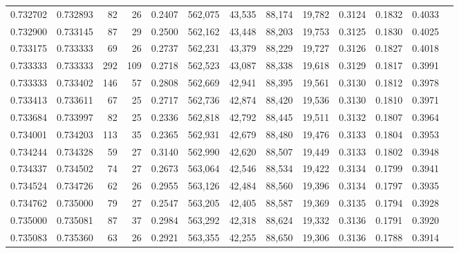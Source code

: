\begin{tabular}{rrrrrrrrrrrrr}
0.732702 & 0.732893 &     82 &    26 &                                     0.2407 & 562,075 &  43,535 &  88,174 &  19,782 & 0.3124 & 0.1832 & 0.4033 \\
0.732900 & 0.733145 &     87 &    29 &                                     0.2500 & 562,162 &  43,448 &  88,203 &  19,753 & 0.3125 & 0.1830 & 0.4025 \\
0.733175 & 0.733333 &     69 &    26 &                                     0.2737 & 562,231 &  43,379 &  88,229 &  19,727 & 0.3126 & 0.1827 & 0.4018 \\
0.733333 & 0.733333 &    292 &   109 &                                     0.2718 & 562,523 &  43,087 &  88,338 &  19,618 & 0.3129 & 0.1817 & 0.3991 \\
0.733333 & 0.733402 &    146 &    57 &                                     0.2808 & 562,669 &  42,941 &  88,395 &  19,561 & 0.3130 & 0.1812 & 0.3978 \\
0.733413 & 0.733611 &     67 &    25 &                                     0.2717 & 562,736 &  42,874 &  88,420 &  19,536 & 0.3130 & 0.1810 & 0.3971 \\
0.733684 & 0.733997 &     82 &    25 &                                     0.2336 & 562,818 &  42,792 &  88,445 &  19,511 & 0.3132 & 0.1807 & 0.3964 \\
0.734001 & 0.734203 &    113 &    35 &                                     0.2365 & 562,931 &  42,679 &  88,480 &  19,476 & 0.3133 & 0.1804 & 0.3953 \\
0.734244 & 0.734328 &     59 &    27 &                                     0.3140 & 562,990 &  42,620 &  88,507 &  19,449 & 0.3133 & 0.1802 & 0.3948 \\
0.734337 & 0.734502 &     74 &    27 &                                     0.2673 & 563,064 &  42,546 &  88,534 &  19,422 & 0.3134 & 0.1799 & 0.3941 \\
0.734524 & 0.734726 &     62 &    26 &                                     0.2955 & 563,126 &  42,484 &  88,560 &  19,396 & 0.3134 & 0.1797 & 0.3935 \\
0.734762 & 0.735000 &     79 &    27 &                                     0.2547 & 563,205 &  42,405 &  88,587 &  19,369 & 0.3135 & 0.1794 & 0.3928 \\
0.735000 & 0.735081 &     87 &    37 &                                     0.2984 & 563,292 &  42,318 &  88,624 &  19,332 & 0.3136 & 0.1791 & 0.3920 \\
0.735083 & 0.735360 &     63 &    26 &                                     0.2921 & 563,355 &  42,255 &  88,650 &  19,306 & 0.3136 & 0.1788 & 0.3914 \\

\end{tabular}
